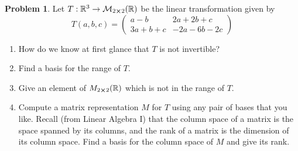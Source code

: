 \documentclass[10pt]{article}
\theoremstyle{definition}
\newtheorem{problem}{Problem}
\begin{document}
\begin{problem}
Let $T:\mathbb{R}^3\to\mathcal{M}_{2\cross 2}(\mathbb{R})$ be the linear transformation given by
$$T(a,b,c)=\begin{pmatrix}
    a-b    & 2a+2b+c   \\
    3a+b+c & -2a-6b-2c
  \end{pmatrix}$$
\begin{enumerate}[label=(\alph*)]
  \item How do we know at first glance that $T$ is not invertible?
  \item Find a basis for the range of $T$.
  \item Give an element of $M_{2\cross 2}(\mathbb{R})$ which is not in the range of $T$.
  \item Compute a matrix representation $M$ for $T$ using any pair of bases that you like. Recall (from Linear Algebra I) that the column space of a matrix is
        the space spanned by its columns, and the rank of a matrix is the dimension of its column space. Find a basis for the column space of $M$ and give its rank.
\end{enumerate}
\end{problem}
\end{document}
